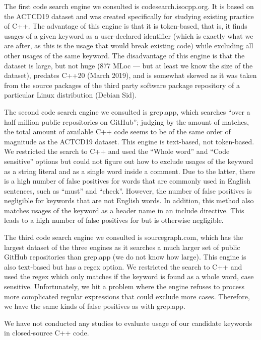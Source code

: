 The first code search engine we consulted is codesearch.isocpp.org. It is based on the ACTCD19 dataset and was created specifically for studying existing practice of C++. The advantage of this engine is that it is token-based, that is, it finds usages of a given keyword as a user-declared identifier (which is exactly what we are after, as this is the usage that would break existing code) while excluding all other usages of the same keyword. The disadvantage of this engine is that the dataset is large, but not huge (877 MLoc --- but at least we know the size of the dataset), predates C++20 (March 2019), and is somewhat skewed as it was taken from the source packages of the third party software package repository of a particular Linux distribution (Debian Sid).

The second code search engine we consulted is grep.app, which searches ``over a half million public repositories on GitHub''; judging by the amount of matches, the total amount of available C++ code seems to be of the same order of magnitude as the ACTCD19 dataset. This engine is text-based, not token-based. We restricted the search to C++ and used the ``Whole word'' and ``Code sensitive'' options but could not figure out how to exclude usages of the keyword as a string literal and as a single word inside a comment. Due to the latter, there is a high number of false positives for words that are commonly used in English sentences, such as ``must'' and ``check''. However, the number of false positives is negligible for keywords that are not English words. In addition, this method also matches usages of the keyword as a header name in an include directive. This leads to a high number of false positives for  but is otherwise negligible.

The third code search engine we consulted is sourcegraph.com, which has the largest dataset of the three engines as it searches a much larger set of public GitHub repositories than grep.app (we do not know how large). This engine is also text-based but has a regex option. We restricted the search to C++ and used the regex  which only matches if the keyword is found as a whole word, case sensitive. Unfortunately, we hit a problem where the engine refuses to process more complicated regular expressions that could exclude more cases. Therefore, we have the same kinds of false positives as with grep.app.

We have not conducted any studies to evaluate usage of our candidate keywords in closed-source C++ code.

